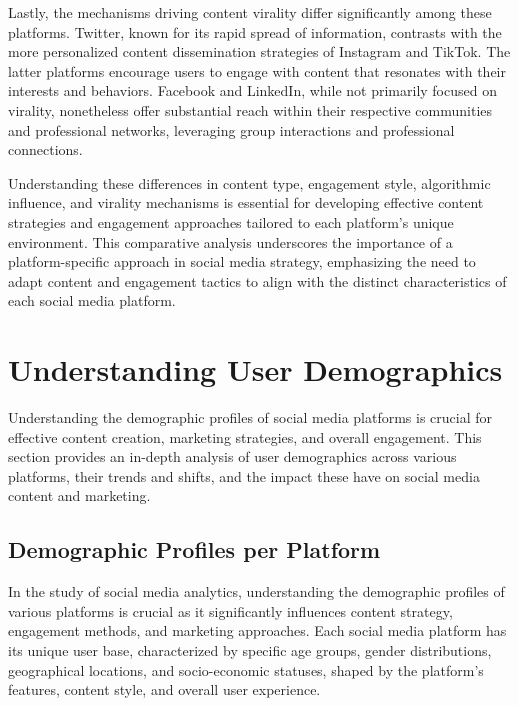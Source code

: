 \documentclass[
]{book}
\begin{document}
Lastly, the mechanisms driving content virality differ significantly among these platforms. Twitter, known for its rapid spread of information, contrasts with the more personalized content dissemination strategies of Instagram and TikTok. The latter platforms encourage users to engage with content that resonates with their interests and behaviors. Facebook and LinkedIn, while not primarily focused on virality, nonetheless offer substantial reach within their respective communities and professional networks, leveraging group interactions and professional connections.

Understanding these differences in content type, engagement style, algorithmic influence, and virality mechanisms is essential for developing effective content strategies and engagement approaches tailored to each platform's unique environment. This comparative analysis underscores the importance of a platform-specific approach in social media strategy, emphasizing the need to adapt content and engagement tactics to align with the distinct characteristics of each social media platform.

\hypertarget{understanding-user-demographics}{%
\section*{Understanding User Demographics}\label{understanding-user-demographics}}

Understanding the demographic profiles of social media platforms is crucial for effective content creation, marketing strategies, and overall engagement. This section provides an in-depth analysis of user demographics across various platforms, their trends and shifts, and the impact these have on social media content and marketing.

\hypertarget{demographic-profiles-per-platform}{%
\subsection*{Demographic Profiles per Platform}\label{demographic-profiles-per-platform}}

In the study of social media analytics, understanding the demographic profiles of various platforms is crucial as it significantly influences content strategy, engagement methods, and marketing approaches. Each social media platform has its unique user base, characterized by specific age groups, gender distributions, geographical locations, and socio-economic statuses, shaped by the platform's features, content style, and overall user experience.
\end{document}
